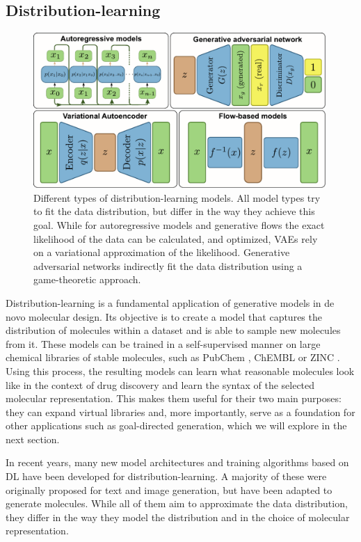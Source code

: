 \subsection{Distribution-learning}
\begin{figure}
    \centering
    \includegraphics[width=0.99\textwidth]{figures/distribution-learning-models.pdf}
    \caption{Different types of distribution-learning models. All model types
        try to fit the data distribution, but differ in the way they achieve this goal.
        While for autoregressive models and generative flows the exact likelihood of the data can be calculated,
        and optimized, VAEs rely on a variational approximation of the likelihood. Generative adversarial networks
        indirectly fit the data distribution using a game-theoretic approach. \label{fig:distribution-learning-models}}
\end{figure}
Distribution-learning is a fundamental application of generative models in de novo molecular design. Its
objective is to create a model that captures the distribution of molecules within a dataset and is
able to sample new molecules from it. These models can be trained in a self-supervised manner on
large chemical libraries of stable molecules, such as PubChem
\citep{kimPubChemSubstanceCompound2016}, ChEMBL \citep{bentoChEMBLBioactivityDatabase2014} or ZINC
\citep{irwinZINCFreeTool2012}. Using this process, the resulting models can learn what reasonable
molecules look like in the context of drug discovery and learn the syntax of the selected molecular
representation. This makes them useful for their two main purposes: they can expand virtual
libraries and, more importantly, serve as a foundation for other applications such as goal-directed
generation, which we will explore in the next section.

In recent years, many new model architectures and training algorithms based on \ac{DL} have been
developed for distribution-learning. A majority of these were originally proposed for text and
image generation, but have been adapted to generate molecules. While all of them aim to approximate
the data distribution, they differ in the way they model the distribution and in the choice of
molecular representation.

